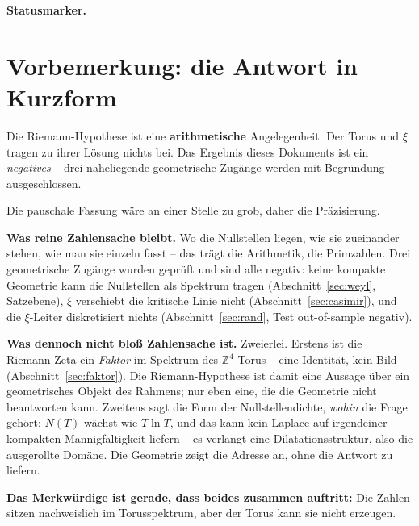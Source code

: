 
\medskip\noindent\textbf{Statusmarker.}


\section*{Vorbemerkung: die Antwort in Kurzform}

\begin{keyresult}[Ergebnis]
Die Riemann-Hypothese ist eine \textbf{arithmetische} Angelegenheit.
Der Torus und $\xi$ tragen zu ihrer L\"osung nichts bei. Das Ergebnis
dieses Dokuments ist ein \emph{negatives} -- drei naheliegende
geometrische Zug\"ange werden mit Begr\"undung ausgeschlossen.
\end{keyresult}

Die pauschale Fassung w\"are an einer Stelle zu grob, daher die
Pr\"azisierung.

\textbf{Was reine Zahlensache bleibt.} Wo die Nullstellen liegen, wie
sie zueinander stehen, wie man sie einzeln fasst -- das tr\"agt die
Arithmetik, die Primzahlen. Drei geometrische Zug\"ange wurden gepr\"uft
und sind alle negativ: keine kompakte Geometrie kann die Nullstellen als
Spektrum tragen (Abschnitt~\ref{sec:weyl}, Satzebene), $\xi$ verschiebt
die kritische Linie nicht (Abschnitt~\ref{sec:casimir}), und die
$\xi$-Leiter diskretisiert nichts (Abschnitt~\ref{sec:rand}, Test
out-of-sample negativ).

\textbf{Was dennoch nicht blo\ss{} Zahlensache ist.} Zweierlei. Erstens
ist die Riemann-Zeta ein \emph{Faktor} im Spektrum des
$\mathbb{Z}^4$-Torus -- eine Identit\"at, kein Bild
(Abschnitt~\ref{sec:faktor}). Die Riemann-Hypothese ist damit eine
Aussage \"uber ein geometrisches Objekt des Rahmens; nur eben eine, die
die Geometrie nicht beantworten kann. Zweitens sagt die Form der
Nullstellendichte, \emph{wohin} die Frage geh\"ort: $N(T)$ w\"achst wie
$T\ln T$, und das kann kein Laplace auf irgendeiner kompakten
Mannigfaltigkeit liefern -- es verlangt eine Dilatationsstruktur, also
die ausgerollte Dom\"ane. Die Geometrie zeigt die Adresse an, ohne die
Antwort zu liefern.

\textbf{Das Merkw\"urdige ist gerade, dass beides zusammen auftritt:}
Die Zahlen sitzen nachweislich im Torusspektrum, aber der Torus kann sie
nicht erzeugen.

